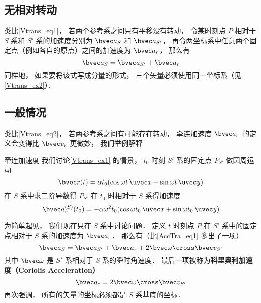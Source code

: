 

\subsection{无相对转动}
类比\autoref{Vtrans_eq1}， 若两个参考系之间只有平移没有转动， 令某时刻点 $P$ 相对于 $S$ 系和 $S'$ 系的加速度分别为 $\bvec a_S$ 和 $\bvec a_{S'}$， 再令两坐标系中任意两个固定点（例如各自的原点）之间的加速度为 $\bvec a_r$， 那么有
\begin{equation}\label{AccTra_eq1}
\bvec a_S = \bvec a_{S'} + \bvec a_r
\end{equation}
同样地， 如果要将该式写成分量的形式， 三个矢量必须使用同一坐标系（见\autoref{Vtrans_ex2}）．

\subsection{一般情况}
类比\autoref{Vtrans_eq2}， 若两参考系之间有可能存在转动， 牵连加速度 $\bvec a_{r}$ 的定义会变得比 $\bvec v_r$ 更微妙， 我们举例解释

\begin{example}{牵连加速度}
我们讨论\autoref{Vtrans_ex1} 的情景， $t_0$ 时刻 $S'$ 系的固定点 $P_{S'}$ 做圆周运动
\begin{equation}
\bvec r(t) = \alpha t_0 (\cos\omega t\, \uvec x + \sin\omega t\, \uvec y)
\end{equation}
在 $S$ 系中求二阶导数得 $P_{S'}$ 在 $t_0$ 时相对于 $S$ 系得加速度
\begin{equation}
\bvec a_r^{(S)}(t_0) = - \alpha \omega^2 t_0 (\cos\omega t_0\, \uvec x + \sin\omega t_0\, \uvec y)
\end{equation}


\end{example}

为简单起见， 我们现在只在 $S$ 系中讨论问题． 定义 $t$ 时刻点 $P$ 在 $S'$ 系中的固定点相对于 $S$ 系的加速度为 $\bvec a_{r}$． 那么有（比\autoref{AccTra_eq1} 多出了一项）
\begin{equation}\label{AccTra_eq2}
\bvec a_S = \bvec a_{S'} + \bvec a_{r} + 2 \bvec \omega \cross \bvec v_{S'}
\end{equation}
其中 $\bvec \omega$ 是 $S'$ 系相对于 $S$ 系的瞬时角速度． 最后一项被称为\textbf{科里奥利加速度（Coriolis Acceleration）}
\begin{equation}
\bvec a_c = 2 \bvec \omega \cross \bvec v_{S'}
\end{equation}
再次强调， 所有的矢量的坐标必须都是 $S$ 系基底的坐标．

